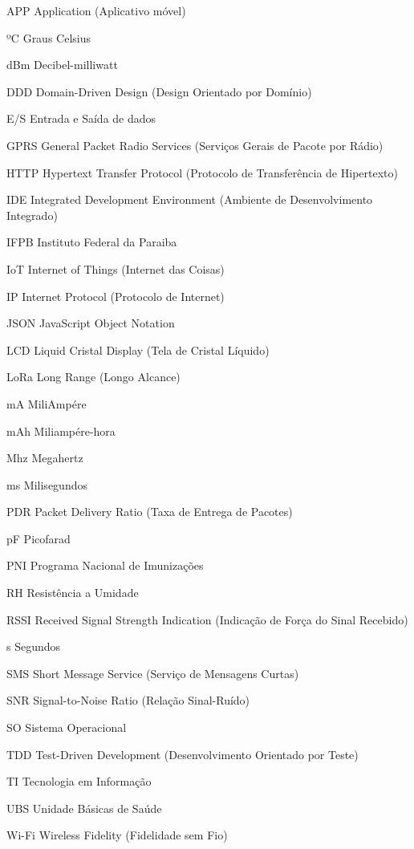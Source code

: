 \listoffigures*
\cleardoublepage

\listoftables*
\cleardoublepage

\begin{siglas}
  \item[APP]    Application (Aplicativo móvel)
  \item[ºC]     Graus Celsius 
  \item[dBm]    Decibel-milliwatt
  \item[DDD]    Domain-Driven Design (Design Orientado por Domínio)
  \item[E/S]    Entrada e Saída de dados
  \item[GPRS]   General Packet Radio Services (Serviços Gerais de Pacote por Rádio)
  \item[HTTP]   Hypertext Transfer Protocol (Protocolo de Transferência de Hipertexto)
  \item[IDE]    Integrated Development Environment (Ambiente de Desenvolvimento Integrado)
  \item[IFPB]   Instituto Federal da Paraiba
  \item[IoT]    Internet of Things (Internet das Coisas)
  \item[IP]     Internet Protocol (Protocolo de Internet)
  \item[JSON]   JavaScript Object Notation
  \item[LCD]    Liquid Cristal Display (Tela de Cristal Líquido)
  \item[LoRa]   Long Range (Longo Alcance)
  \item[mA]     MiliAmpére
  \item[mAh]    Miliampére-hora
  \item[Mhz]    Megahertz
  \item[ms]     Milisegundos
  \item[PDR]    Packet Delivery Ratio (Taxa de Entrega de Pacotes)
  \item[pF]     Picofarad
  \item[PNI]    Programa Nacional de Imunizações
  \item[RH]     Resistência a Umidade
  \item[RSSI]   Received Signal Strength Indication (Indicação de Força do Sinal Recebido)
  \item[s]      Segundos
  \item[SMS]    Short Message Service (Serviço de Mensagens Curtas)
  \item[SNR]    Signal-to-Noise Ratio (Relação Sinal-Ruído)
  \item[SO]     Sistema Operacional
  \item[TDD]    Test-Driven Development (Desenvolvimento Orientado por Teste)
  \item[TI]     Tecnologia em Informação
  \item[UBS]    Unidade Básicas de Saúde
  \item[Wi-Fi]  Wireless Fidelity (Fidelidade sem Fio)
\end{siglas}